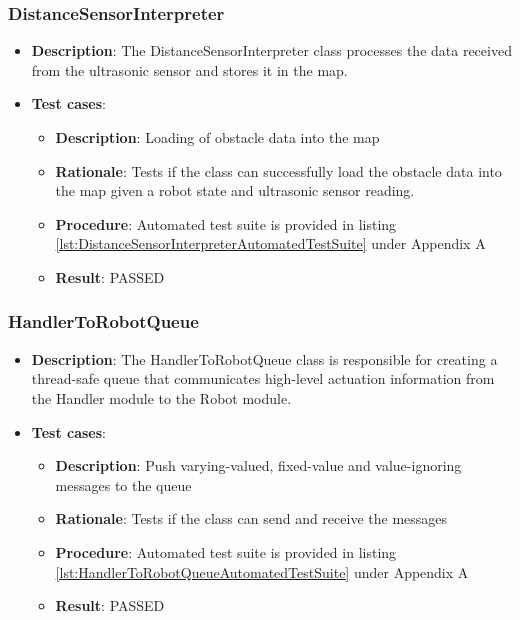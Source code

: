 \documentclass[12pt,a4paper]{article}
\begin{document}
	\subsubsection{DistanceSensorInterpreter}
	\begin{itemize}
	\item \textbf{Description}:	The DistanceSensorInterpreter class processes the data received from the ultrasonic sensor and stores it in the map.
	\item \textbf{Test cases}:
	\begin{itemize}
		\item \textbf{Description}:	Loading of obstacle data into the map
		\item \textbf{Rationale}:	Tests if the class can successfully load the obstacle data into the map given a robot state and ultrasonic sensor reading.
		\item \textbf{Procedure}:	Automated test suite is provided in listing \ref{lst:DistanceSensorInterpreterAutomatedTestSuite} under Appendix A
		\item \textbf{Result}:		PASSED
	\end{itemize}
	\end{itemize}
    
    \subsubsection{HandlerToRobotQueue}
	\begin{itemize}
	\item \textbf{Description}: The HandlerToRobotQueue class is responsible for creating a thread-safe queue that communicates high-level actuation information from the Handler module to the Robot module.
	\item \textbf{Test cases}:
	\begin{itemize}
		\item \textbf{Description}:	Push varying-valued, fixed-value and value-ignoring messages to the queue
		\item \textbf{Rationale}: Tests if the class can send and receive the messages
		\item \textbf{Procedure}: Automated test suite is provided in listing \ref{lst:HandlerToRobotQueueAutomatedTestSuite} under Appendix A
		\item \textbf{Result}: PASSED
	\end{itemize}
	\end{itemize}
    
\end{document}
